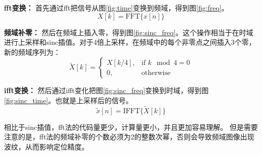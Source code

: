 \textbf{fft变换：}
首先通过fft把信号从图\ref{fig:time}变换到频域，得到图\ref{fig:freq}。
\[ X[k] = \text{FFT}\{ x[n] \} \]

\textbf{频域补零：}
然后在频域上插入零，得到图\ref{fig:sinc_freq}。这个操作相当于在时域进行上采样和sinc插值。对于4倍上采样，在频域中的每个非零点之间插入3个零，新的频域序列为：
\[ \tilde{X}[k] = \begin{cases}
X[k/4], & \text{if } k \mod 4 = 0 \\
0, & \text{otherwise}
\end{cases} \]

\textbf{ifft变换：}
然后通过ifft变化把图\ref{fig:sinc_freq}变换到时域，得到图\ref{fig:sinc_time}。也就是上采样后的信号。
\[ \tilde{x}[n] = \text{IFFT}\{ \tilde{X}[k] \} \]

相比于sinc插值，fft法的代码量更少，计算量更小，并且更加容易理解。
但是需要注意的是，fft法的频域补零的个数必须为2的整数次幂，否则会导致频域图像出现波纹，从而影响定位精度。


